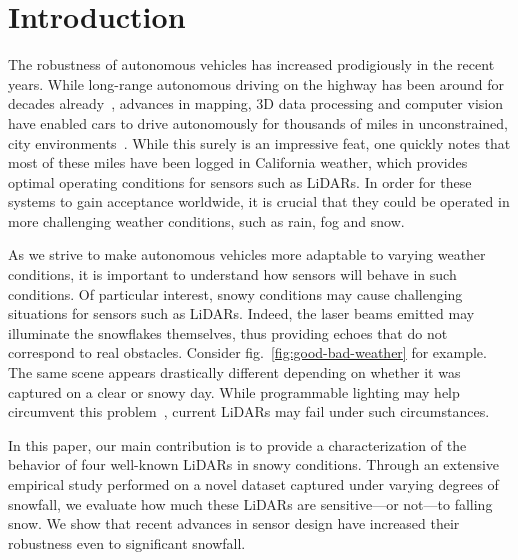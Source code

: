 \section{Introduction}
\label{sec:chap_lidar_intro}

The robustness of autonomous vehicles has increased prodigiously in the recent years. While long-range autonomous driving on the highway has been around for decades already~\cite{Pomerleau_1996_616}, advances in mapping, 3D data processing and computer vision have enabled cars to drive autonomously for thousands of miles in unconstrained, city environments~\cite{urmson2008autonomous}. While this surely is an impressive feat, one quickly notes that most of these miles have been logged in California weather, which provides optimal operating conditions for sensors such as LiDARs. In order for these systems to gain acceptance worldwide, it is crucial that they could be operated in more challenging weather conditions, such as rain, fog and snow.

As we strive to make autonomous vehicles more adaptable to varying weather conditions, it is important to understand how sensors will behave in such conditions. Of particular interest, snowy conditions may cause challenging situations for sensors such as LiDARs. Indeed, the laser beams emitted may illuminate the snowflakes themselves, thus providing echoes that do not correspond to real obstacles. Consider fig.~\ref{fig:good-bad-weather} for example. The same scene appears drastically different depending on whether it was captured on a clear or snowy day. While programmable lighting may help circumvent this problem~\cite{tamburo2014programmable}, current LiDARs may fail under such circumstances.

In this paper, our main contribution is to provide a characterization of the behavior of four well-known LiDARs in snowy conditions. Through an extensive empirical study performed on a novel dataset captured under varying degrees of snowfall, we evaluate how much these LiDARs are sensitive---or not---to falling snow. We show that recent advances in sensor design have increased their robustness even to significant snowfall.

